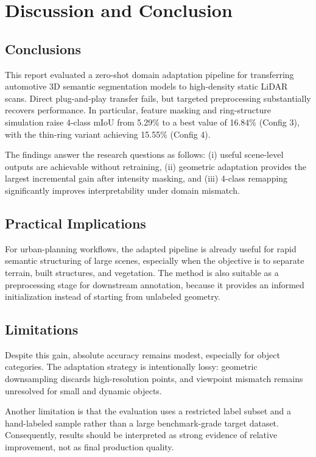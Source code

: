 \documentclass[12pt, a4paper]{report}
\begin{document}
\chapter{Discussion and Conclusion}
\section{Conclusions}
This report evaluated a zero-shot domain adaptation pipeline for transferring automotive 3D semantic segmentation models to high-density static LiDAR scans. Direct plug-and-play transfer fails, but targeted preprocessing substantially recovers performance. In particular, feature masking and ring-structure simulation raise 4-class \ac{mIoU} from 5.29\% to a best value of 16.84\% (Config 3), with the thin-ring variant achieving 15.55\% (Config 4).

The findings answer the research questions as follows: (i) useful scene-level outputs are achievable without retraining, (ii) geometric adaptation provides the largest incremental gain after intensity masking, and (iii) 4-class remapping significantly improves interpretability under domain mismatch.

\section{Practical Implications}
For urban-planning workflows, the adapted pipeline is already useful for rapid semantic structuring of large scenes, especially when the objective is to separate terrain, built structures, and vegetation. The method is also suitable as a preprocessing stage for downstream annotation, because it provides an informed initialization instead of starting from unlabeled geometry.

\section{Limitations}
Despite this gain, absolute accuracy remains modest, especially for object categories. The adaptation strategy is intentionally lossy: geometric downsampling discards high-resolution points, and viewpoint mismatch remains unresolved for small and dynamic objects.

Another limitation is that the evaluation uses a restricted label subset and a hand-labeled sample rather than a large benchmark-grade target dataset. Consequently, results should be interpreted as strong evidence of relative improvement, not as final production quality.
\end{document}
